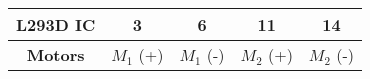 \begin{tabular}[12pt]{ |c| c| c| c| c|}
    \hline
    \textbf{L293D IC} & 3 & 6 & 11 & 14 \\ 
    \hline
    \textbf{Motors} & $M_1$ (+) & $M_1$ (-) & $M_2$ (+) & $M_2$ (-)\\ 
    \hline 
    \end{tabular}
